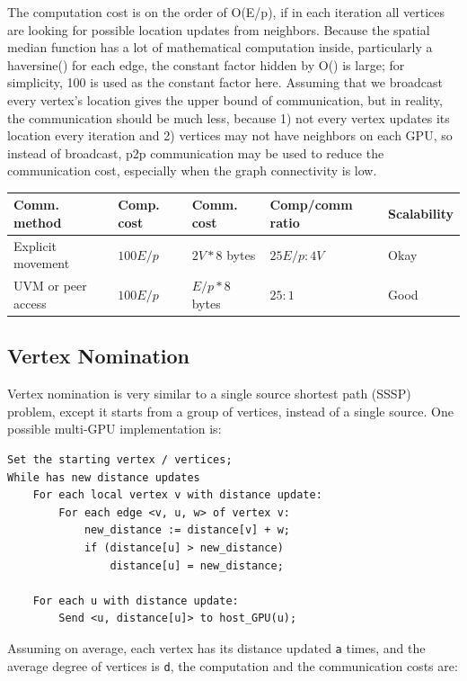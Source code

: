 \documentclass[10pt,oneside]{memoir}
\begin{document}
The computation cost is on the order of O(\textbar{}E\textbar{}/p), if
in each iteration all vertices are looking for possible location updates
from neighbors. Because the spatial median function has a lot of
mathematical computation inside, particularly a haversine() for each
edge, the constant factor hidden by O() is large; for simplicity, 100 is
used as the constant factor here. Assuming that we broadcast every
vertex's location gives the upper bound of communication, but in
reality, the communication should be much less, because 1) not every
vertex updates its location every iteration and 2) vertices may not have
neighbors on each GPU, so instead of broadcast, p2p communication may be
used to reduce the communication cost, especially when the graph
connectivity is low.

\begin{longtable}[]{@{}lllll@{}}
\toprule
Comm. method & Comp. cost & Comm. cost & Comp/comm ratio &
Scalability\tabularnewline
\midrule
\endhead
Explicit movement & \(100E/p\) & \(2V * 8\) bytes & \(25E/p : 4V\) &
Okay\tabularnewline
UVM or peer access & \(100E/p\) & \(E/p * 8\) bytes & \(25 : 1\) &
Good\tabularnewline
\bottomrule
\end{longtable}

\hypertarget{vertex-nomination-2}{%
\subsection{Vertex Nomination}\label{vertex-nomination-2}}

Vertex nomination is very similar to a single source shortest path
(SSSP) problem, except it starts from a group of vertices, instead of a
single source. One possible multi-GPU implementation is:

\begin{verbatim}
Set the starting vertex / vertices;
While has new distance updates
    For each local vertex v with distance update:
        For each edge <v, u, w> of vertex v:
            new_distance := distance[v] + w;
            if (distance[u] > new_distance)
                distance[u] = new_distance;

    For each u with distance update:
        Send <u, distance[u]> to host_GPU(u);
\end{verbatim}

Assuming on average, each vertex has its distance updated \texttt{a}
times, and the average degree of vertices is \texttt{d}, the computation
and the communication costs are:
\end{document}
